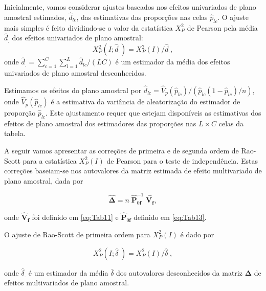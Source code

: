 \documentclass[]{book}
\theoremstyle{definition}
\theoremstyle{definition}
\theoremstyle{definition}
\theoremstyle{remark}
\begin{document}
Inicialmente, vamos considerar ajustes baseados nos efeitos univariados
de plano amostral estimados, \(\hat{d}_{lc}\), das estimativas das
proporções nas celas \(\hat{p}_{lc}\). O ajuste mais simples é feito
dividindo-se o valor da estatística \(X_{P}^{2}\) de Pearson pela média
\(\hat{d}_{.}\) dos efeitos univariados de plano amostral: \[
X_{P}^{2}\left( I;\hat{d}_{.}\right) =X_{P}^{2}\left( I\right) /\hat{d}
_{.}, 
\] onde
\(\hat{d}_{.}=\sum_{c=1}^{C}\sum_{l=1}^{L}\hat{d}_{lc}/\left( LC\right)\)
é um estimador da média dos efeitos univariados de plano amostral
desconhecidos.

Estimamos os efeitos do plano amostral por
\(\hat{d}_{lc}=\hat{V}_{p}\left(\hat{p}_{lc}\right) /\left( \hat{p}_{lc}\left( 1-\hat{p}_{lc}\right) /n\right)\),
onde \(\hat{V}_{p}\left( \hat{p}_{lc}\right)\) é a estimativa da
variância de aleatorização do estimador de proporção \(\hat{p}_{lc}\).
Este ajustamento requer que estejam disponíveis as estimativas dos
efeitos de plano amostral dos estimadores das proporções nas
\(L\times C\) celas da tabela.

A seguir vamos apresentar as correções de primeira e de segunda ordem de
Rao-Scott para a estatística \(X_{P}^{2}\left( I\right)\) de Pearson
para o teste de independência. Estas correções baseiam-se nos
autovalores da matriz estimada de efeito multivariado de plano amostral,
dada por

\begin{equation}
\mathbf{\hat{\Delta}}=n\;\mathbf{\hat{P}}_{0\mathbf{f}}^{-1}\;\mathbf{\hat{V}
}_{\mathbf{f}},  \label{eq:Tab14}
\end{equation}

onde \(\mathbf{\hat{V}}_{\mathbf{f}}\) foi definido em \eqref{eq:Tab11} e
\(\mathbf{ \hat{P}}_{0\mathbf{f}}\) definido em \eqref{eq:Tab13}.

O ajuste de Rao-Scott de primeira ordem para
\(X_{P}^{2}\left( I\right)\) é dado por

\begin{equation}
X_{P}^{2}\left( I;\hat{\delta}_{.}\right) =X_{P}^{2}\left( I\right) /\hat{
\delta}_{.},  \label{eq:Tab15}
\end{equation}

onde \(\hat{\delta}_{.}\) é um estimador da média \(\bar{\delta}\) dos
autovalores desconhecidos da matriz \(\mathbf{\Delta }\) de efeitos
multivariados de plano amostral.
\end{document}
